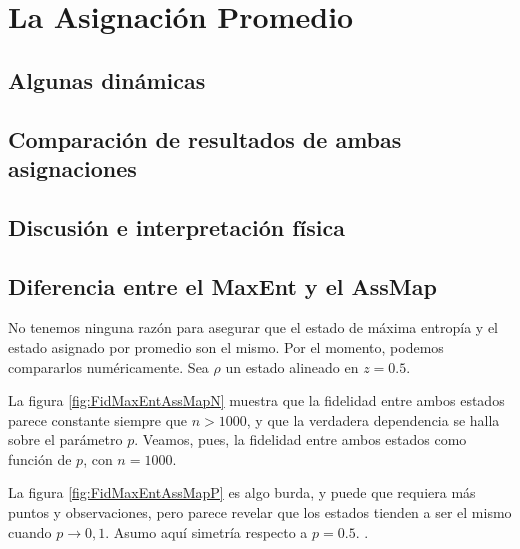 \chapter{La Asignación Promedio}

\section{Algunas dinámicas}

\section{Comparación de resultados de ambas asignaciones}

\section{Discusión e interpretación física}

\section{Diferencia entre el MaxEnt y el AssMap}
No tenemos ninguna razón para asegurar que el estado de máxima entropía y el estado asignado por promedio son el mismo. Por el momento, podemos compararlos numéricamente. Sea $\rho$ un estado alineado en $z=0.5$. 



La figura \ref{fig:FidMaxEntAssMapN} muestra que la fidelidad entre ambos estados parece constante siempre que $n>1000$, y que la verdadera dependencia se halla sobre el parámetro $p$. Veamos, pues, la fidelidad entre ambos estados como función de $p$, con $n=1000$.



La figura \ref{fig:FidMaxEntAssMapP} es algo burda, y puede que requiera más puntos y observaciones, pero parece revelar que los estados tienden a ser el mismo cuando $p\rightarrow 0,1$. Asumo aquí simetría respecto a $p=0.5$. .